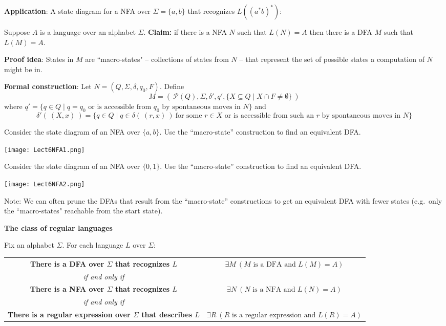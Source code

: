 \documentclass[12pt, oneside]{article}
\begin{document}
{\bf Application}: A state diagram for a NFA over $\Sigma = \{a,b\}$ 
that recognizes $L (( a^*b)^* )$:

\vfill
\newpage
Suppose $A$ is a language over an alphabet $\Sigma$.
{\bf Claim:} if there is a NFA $N$ such that $L(N) = A$ then 
there is a DFA $M$ such that $L(M) = A$.

{\bf Proof idea}: States in $M$ are ``macro-states" -- collections of states from $N$ -- 
that represent the set of possible states a computation of $N$ might be in.


{\bf Formal construction}: Let $N = (Q, \Sigma, \delta, q_0, F)$.  Define 
\[
M = (~ \mathcal{P}(Q), \Sigma, \delta', q',  \{ X \subseteq Q \mid X \cap F \neq \emptyset \}~ )
\]
where $q' = \{ q \in Q \mid \text{$q = q_0$ or is accessible from $q_0$ by spontaneous moves in $N$} \}$
and 
\[
    \delta' (~(X, x)~) = \{ q \in Q \mid q \in \delta( ~(r,x)~) ~\text{for some $r \in X$ or is accessible 
from such an $r$ by spontaneous moves in $N$} \}
\]


Consider the state diagram of an NFA over $\{a,b\}$. Use the ``macro-state'' construction 
to find an equivalent DFA.

\texttt{[image: Lect6NFA1.png]}




\vfill

Consider the state diagram of an NFA over $\{0,1\}$. Use the ``macro-state'' construction 
to find an equivalent DFA.


\texttt{[image: Lect6NFA2.png]}


\vfill

Note: We can often prune the DFAs that result from the ``macro-state'' constructions to get an 
equivalent DFA with fewer states (e.g.\ only the ``macro-states" reachable from the start state).

\newpage


{\bf The class of regular languages}

Fix an alphabet $\Sigma$. For each language $L$ over $\Sigma$:
\begin{center}
\begin{tabular}{cc}
    {\bf There is a DFA over $\Sigma$ that recognizes $L$}&$\exists M ~(M \textrm{ is a DFA and } L(M) = A)$\\
    {\it if and only if}&\\
    {\bf There is a NFA over $\Sigma$ that recognizes $L$}&$\exists N ~(N \textrm{ is a NFA and } L(N) = A)$\\
    {\it if and only if}&\\
    {\bf There is a regular expression over $\Sigma$ that describes $L$} &$\exists R ~(R \textrm{ is a regular expression and } L(R) = A)$\\
\end{tabular}
\end{center}
\end{document}
